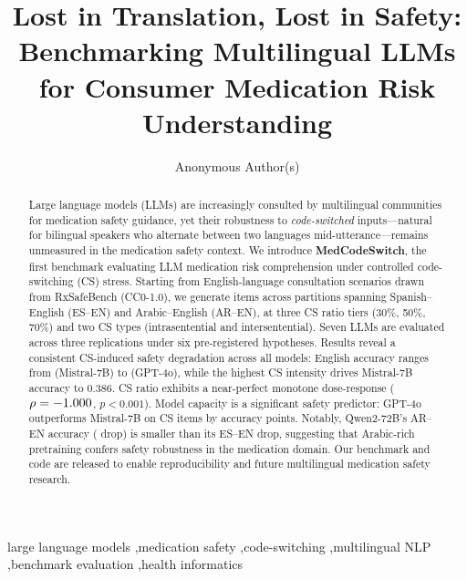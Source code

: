 \documentclass[3p,times,procedia]{elsarticle}
\begin{document}
\begin{frontmatter}


\title{Lost in Translation, Lost in Safety: Benchmarking Multilingual LLMs
       for Consumer Medication Risk Understanding}

\author[anon]{Anonymous Author(s)}
\address[anon]{Affiliation(s) withheld for double-blind review.}

\begin{abstract}
Large language models (LLMs) are increasingly consulted by multilingual
communities for medication safety guidance, yet their robustness to
\emph{code-switched} inputs—natural for bilingual speakers who alternate
between two languages mid-utterance—remains unmeasured in the medication
safety context.
We introduce \textbf{MedCodeSwitch}, the first benchmark evaluating LLM
medication risk comprehension under controlled code-switching (CS) stress.
Starting from \NItemsBase{} English-language consultation scenarios drawn
from RxSafeBench (CC0-1.0), we generate \NItemsTotal{} items across
\NPartitions{} partitions spanning Spanish–English (ES–EN) and Arabic–English
(AR–EN), at three CS ratio tiers (30\%, 50\%, 70\%) and two CS types
(intrasentential and intersentential).
Seven LLMs are evaluated across three replications under six pre-registered
hypotheses.
Results reveal a consistent CS-induced safety degradation across all models:
English accuracy ranges from \MistralEnAcc{} (Mistral-7B) to \GptFourOEnAcc{}
(GPT-4o), while the highest CS intensity drives Mistral-7B accuracy to 0.386.
CS ratio exhibits a near-perfect monotone dose-response ($\rho=-1.000$,
$p<0.001$).
Model capacity is a significant safety predictor: GPT-4o outperforms Mistral-7B
on CS items by \GptMistralCsGap{} accuracy points.
Notably, Qwen2-72B's AR–EN accuracy (\QwenArDrop{} drop) is smaller than its
ES–EN drop, suggesting that Arabic-rich pretraining confers safety robustness
in the medication domain.
Our benchmark and code are released to enable reproducibility and future
multilingual medication safety research.
\end{abstract}

\begin{keyword}
large language models \sep medication safety \sep code-switching
\sep multilingual NLP \sep benchmark evaluation \sep health informatics
\end{keyword}

\end{frontmatter}
\end{document}
